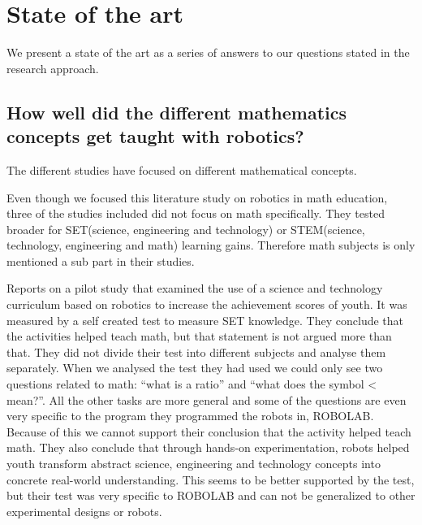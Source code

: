 \chapter{State of the art}
We present a state of the art as a series of answers to our questions stated in the research approach.

%
%
%
%
%
%

\section{How well did the different mathematics concepts get taught with robotics?}
The different studies have focused on different mathematical concepts. 

\bigskip\noindent
Even though we focused this literature study on robotics in math education, three of the studies included did not focus on math specifically\cite{barker2007robotics, nugent2008effect, nugent2009use}. They tested broader for SET(science, engineering and technology) or STEM(science, technology, engineering and math) learning gains. Therefore math subjects is only mentioned a sub part in their studies.

\bigskip\noindent
\cite{barker2007robotics} Reports on a pilot study that examined the use of a science and technology curriculum based on robotics to increase the achievement scores of youth. It was measured by a self created test to measure SET knowledge. They conclude that the activities helped teach math, but that statement is not argued more than that. They did not divide their test into different subjects and analyse them separately. When we analysed the test they had used we could only see two questions related to math: ``what is a ratio'' and ``what does the symbol < mean?''. All the other tasks are more general and some of the questions are even very specific to the program they programmed the robots in, ROBOLAB. Because of this we cannot support their conclusion that the activity helped teach math. They also conclude that through hands-on experimentation, robots helped youth transform abstract science, engineering and technology concepts into concrete real-world understanding. This seems to be better supported by the test, but their test was very specific to ROBOLAB and can not be generalized to other experimental designs or robots.

